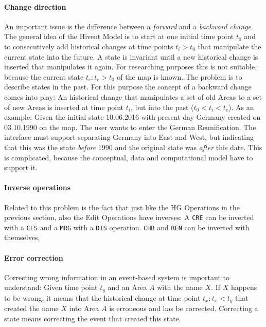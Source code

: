 \paragraph{Change direction} %
\label{par:change_direction}

An important issue is the difference between a \emph{forward} and a \emph{backward change}. The general idea of the Hivent Model is to start at one initial time point $t_0$ and to consecutively add historical changes at time points $t_i > t_0$ that manipulate the current state into the future. A state is invariant until a new historical change is inserted that manipulates it again. For researching purposes this is not suitable, because the current state $t_c: t_c > t_0$ of the map is known. The problem is to describe states in the past. For this purpose the concept of a backward change comes into play: An historical change that manipulates a set of old Areas to a set of new Areas is inserted at time point $t_i$, but into the past ($ t_0 < t_i < t_c$). As an example: Given the initial state 10.06.2016 with present-day Germany created on 03.10.1990 on the map. The user wants to enter the German Reunification. The interface must support separating Germany into East and West, but indicating that this was the state \emph{before} 1990 and the original state was \emph{after} this date. This is complicated, because the conceptual, data and computational model have to support it.


\paragraph{Inverse operations} %
\label{par:inverse_operations}

Related to this problem is the fact that just like the HG Operations in the previous section, also the Edit Operations have inverses: A \texttt{CRE} can be inverted with a \texttt{CES} and a \texttt{MRG} with a \texttt{DIS} operation. \texttt{CHB} and \texttt{REN} can be inverted with themselves,


\paragraph{Error correction} %
\label{par:error_correction}

Correcting wrong information in an event-based system is important to understand: Given time point $t_y$ and an Area $A$ with the name $X$. If $X$ happens to be wrong, it means that the historical change at time point $t_x: t_x < t_y$ that created the name $X$ into Area $A$ is erroneous and has be corrected. Correcting a state means correcting the event that created this state.




